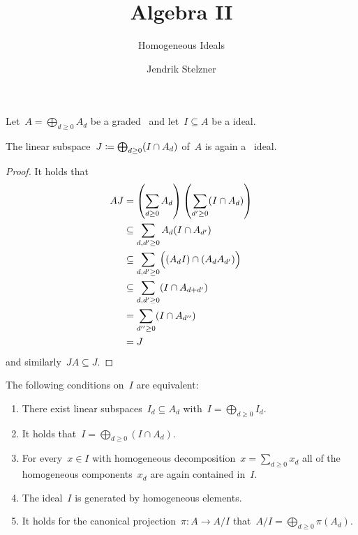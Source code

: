 \documentclass[a4paper,10pt,numbers = noenddot]{scrartcl}
\title{Algebra II}
\subtitle{Homogeneous Ideals}
\author{Jendrik Stelzner}
\date{}
\begin{document}
\maketitle

Let~$A = \bigoplus_{d \geq 0} A_d$ be a graded~{\kalg} and let~$I \subseteq A$ be a {\twosided} ideal.

\begin{lemma}
  The linear subspace~$J \coloneqq \bigoplus_{d \geq 0} (I \cap A_d)$ of~$A$ is again a~{\twosided} ideal.
\end{lemma}

\begin{proof}
  It holds that
  \begin{align*}
                A J
    &=          \left( \sum_{d \geq 0} A_d \right)
                \left( \sum_{d' \geq 0} (I \cap A_d) \right)  \\
    &\subseteq  \sum_{d, d' \geq 0} A_d (I \cap A_{d'}) \\
    &\subseteq  \sum_{d, d' \geq 0} \Bigl( (A_d I) \cap (A_d A_{d'}) \Bigr)  \\
    &\subseteq  \sum_{d, d' \geq 0} (I \cap A_{d+d'}) \\
    &=          \sum_{d'' \geq 0} (I \cap A_{d''})  \\
    &=          J
  \end{align*}
  and similarly~$J A \subseteq J$.
\end{proof}

\begin{proposition}
  \label{characterizations of homogeneous ideals}
  The following conditions on~$I$ are equivalent:
  \begin{enumerate}
    \item
      \label{sum of subspaces}
      There exist linear subspaces~$I_d \subseteq A_d$ with~$I = \bigoplus_{d \geq 0} I_d$.
    \item
      \label{sum of intersections}
      It holds that~$I = \bigoplus_{d \geq 0} (I \cap A_d)$.
    \item
      \label{contains homogeneous components}
      For every~$x \in I$ with homogeneous decomposition~$x = \sum_{d \geq 0} x_d$ all of the homogeneous components~$x_d$ are again contained in~$I$.
    \item
      \label{generated by homogeneous}
      The ideal~$I$ is generated by homogeneous elements.
    \item
      \label{induced grading}
      It holds for the canonical projection~$\pi \colon A \to A/I$ that~$A/I = \bigoplus_{d \geq 0} \pi(A_d)$.
  \end{enumerate}
\end{proposition}
\end{document}
